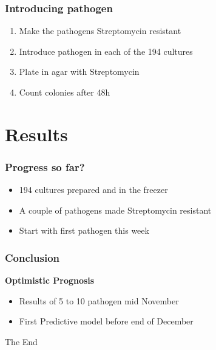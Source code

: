 \documentclass{beamer}
\begin{document}
\begin{frame}[fragile] %
\frametitle{Introducing pathogen}
\begin{enumerate}
\item Make the pathogens Streptomycin resistant
\item Introduce pathogen in each of the 194 cultures 
\item Plate in agar with Streptomycin 
\item Count colonies after 48h
\end{enumerate}
\end{frame}



\section{Results}

\begin{frame}
\frametitle{Progress so far?}
\begin{itemize}
\item 194 cultures prepared and in the freezer
\item A couple of pathogens made Streptomycin resistant
\item Start with first pathogen this week
\end{itemize}
\end{frame}


\begin{frame}
\frametitle{Conclusion}
\textbf{Optimistic Prognosis}
\begin{itemize}
\item Results of 5 to 10 pathogen mid November
\item First Predictive model before end of December
\end{itemize}
\end{frame}




\begin{frame}
\Huge{\centerline{The End}}
\end{frame}

\end{document}

